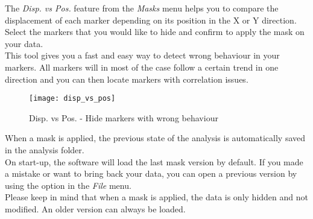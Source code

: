 \indent\indent The \textit{Disp. vs Pos.} feature from the \textit{Masks} menu helps you to compare the displacement of each marker depending on its position in the X or Y direction. Select the markers that you would like to hide and confirm to apply the mask on your data.\\
\newline
\indent This tool gives you a fast and easy way to detect wrong behaviour in your markers. All markers will in most of the case follow a certain trend in one direction and you can then locate markers with correlation issues.\\

\begin{figure}[!h]
   \centering
   \texttt{[image: disp\_vs\_pos]}
   \caption{Disp. vs Pos. - Hide markers with wrong behaviour}
\end{figure}

\newline
\indent When a mask is applied, the previous state of the analysis is automatically saved in the analysis folder.\\
On start-up, the software will load the last mask version by default. If you made a mistake or want to bring back your data, you can open a previous version by using the  option in the \textit{File} menu.\\
\newline
\indent Please keep in mind that when a mask is applied, the data is only hidden and not modified. An older version can always be loaded.
